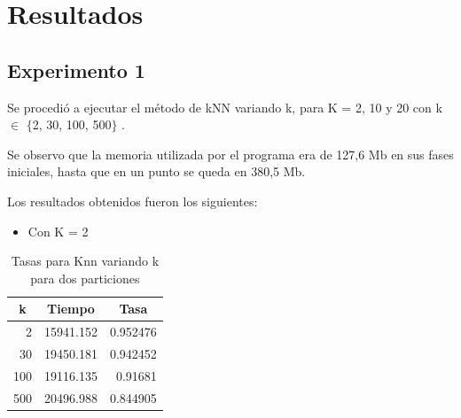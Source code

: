 \section{Resultados}



\subsection{Experimento 1}
Se procedió a ejecutar el método de kNN variando k, para K = 2, 10 y 20 con k $\in$ $\{$2, 30, 100, 500$\}$ .

Se observo que la memoria utilizada por el programa era de 127,6 Mb en sus fases iniciales, hasta que en un punto se queda en 380,5 Mb.

Los resultados obtenidos fueron los siguientes:
\begin{itemize}
\item Con K = 2\\
\end{itemize}

\begin{table}[H]
\centering
\begin{tabular}{|r|r|r|}
\hline
\multicolumn{1}{|c|}{k} & \multicolumn{1}{c|}{Tiempo} & \multicolumn{1}{c|}{Tasa} \\ \hline
2 & 15941.152 & 0.952476 \\ \hline
30 & 19450.181 & 0.942452 \\ \hline
100 & 19116.135 & 0.91681 \\ \hline
500 & 20496.988 & 0.844905 \\ \hline
\end{tabular}
\caption{Tasas para Knn variando k para dos particiones}
\label{}
\end{table}

\bigskip
\bigskip
\bigskip

